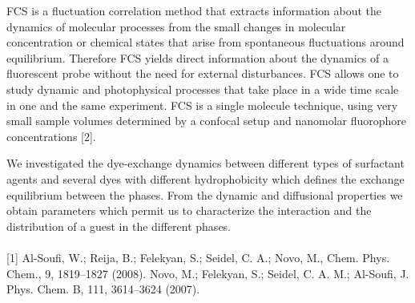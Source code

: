 FCS is a fluctuation correlation method that extracts information about the
dynamics of molecular processes from the small changes in molecular concentration
or chemical states that arise from spontaneous fluctuations around equilibrium.
Therefore FCS yields direct information about the dynamics of a fluorescent probe
without the need for external disturbances. FCS allows one to study dynamic and
photophysical processes that take place in a wide time scale in one and the same
experiment. FCS is a single molecule technique, using very small sample volumes
determined by a confocal setup and nanomolar fluorophore concentrations [2].

We investigated the dye-exchange dynamics between different types of
surfactant agents and several dyes with different hydrophobicity which defines the
exchange equilibrium between the phases. From the dynamic and diffusional
properties we obtain parameters which permit us to characterize the interaction and
the distribution of a guest in the different phases.
\\
\vspace{0.5cm}
\\
{\footnotesize
[1] Al-Soufi, W.; Reija, B.; Felekyan, S.; Seidel, C. A.; Novo, M., Chem. Phys. Chem., 9, 1819--1827
(2008).
\newline
[2] Novo, M.; Felekyan, S.; Seidel, C. A. M.; Al-Soufi, J. Phys. Chem. B, 111, 3614--3624 (2007).
}

\newpage
\setcounter{figure}{0}
